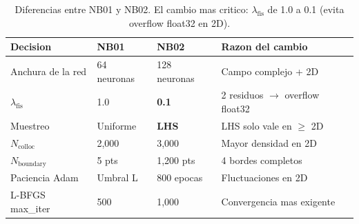 \begin{table}[h!]
\centering
\small
\begin{tabular}{llll}
\toprule
\textbf{Decision} & \textbf{NB01} & \textbf{NB02} & \textbf{Razon del cambio} \\
\midrule
Anchura de la red & 64 neuronas & 128 neuronas & Campo complejo + 2D \\
$\lambda_\text{fis}$ & 1.0 & \textbf{0.1} & 2 residuos $\to$ overflow float32 \\
Muestreo & Uniforme & \textbf{LHS} & LHS solo vale en $\geq$ 2D \\
$N_\text{colloc}$ & 2,000 & 3,000 & Mayor densidad en 2D \\
$N_\text{boundary}$ & 5 pts & 1,200 pts & 4 bordes completos \\
Paciencia Adam & Umbral L & 800 epocas & Fluctuaciones en 2D \\
L-BFGS max\_iter & 500 & 1,000 & Convergencia mas exigente \\
\bottomrule
\end{tabular}
\caption{Diferencias entre NB01 y NB02. El cambio mas critico:
$\lambda_\text{fis}$ de 1.0 a 0.1 (evita overflow float32 en 2D).}
\end{table}
